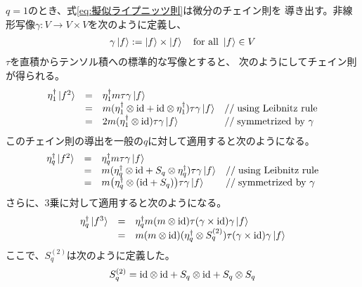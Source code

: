 {	$q=1$のとき、式\eqref{eq:擬似ライプニッツ則}は微分のチェイン則を
	導き出す。非線形写像$\gamma:V\to V\times V$を次のように定義し、
	\begin{equation*}\begin{split}
		\gamma\mathinner{|{f}\rangle} := \mathinner{|{f}\rangle}\times\mathinner{|{f}\rangle} \quad\text{for all }\mathinner{|{f}\rangle}\in V
	\end{split}\end{equation*}
	$\tau$を直積からテンソル積への標準的な写像とすると、
	次のようにしてチェイン則が得られる。
	\begin{equation*}\begin{array}{rcll}
		\eta_1^\dag\mathinner{|{f^2}\rangle} &=& \eta_1^\dag m\tau\gamma\mathinner{|{f}\rangle} \\
		 &=& m(\eta_1^\dag\otimes{\ensuremath{\operatorname{id}}} + {\operatorname{id}}\otimes\eta_1^\dag)\tau\gamma\mathinner{|{f}\rangle} 
		 	& //\;\text{using Leibnitz rule} \\
		 &=& 2m(\eta_1^\dag\otimes{\ensuremath{\operatorname{id}}})\tau\gamma\mathinner{|{f}\rangle} 
		 	& //\;\text{symmetrized by $\gamma$} \\
	\end{array}\end{equation*}
	このチェイン則の導出を一般の$q$に対して適用すると次のようになる。
	\begin{equation*}\begin{array}{rcll}
		\eta_q^\dag\mathinner{|{f^2}\rangle} &=& \eta_q^\dag m\tau\gamma\mathinner{|{f}\rangle} \\
		 &=& m(\eta_q^\dag\otimes{\ensuremath{\operatorname{id}}} + S_q\otimes\eta_q^\dag)\tau\gamma\mathinner{|{f}\rangle} 
		 	& //\;\text{using Leibnitz rule} \\
		 &=& m\bigl(\eta_q^\dag\otimes({\operatorname{id}} + S_q)\bigr)\tau\gamma\mathinner{|{f}\rangle} 
		 	& //\;\text{symmetrized by $\gamma$} \\
	\end{array}\end{equation*}
	さらに、$3$乗に対して適用すると次のようになる。
	\begin{equation*}\begin{array}{rcll}
		\eta_q^\dag\mathinner{|{f^3}\rangle} 
		&=& \eta_q^\dag m(m\otimes{\ensuremath{\operatorname{id}}})\tau(\gamma\times{\ensuremath{\operatorname{id}}})\gamma\mathinner{|{f}\rangle} \\
		&=& m(m\otimes{\ensuremath{\operatorname{id}}})(\eta_q^\dag\otimes S_q^{(2)})
			\tau(\gamma\times{\ensuremath{\operatorname{id}}})\gamma\mathinner{|{f}\rangle}  \\
	\end{array}\end{equation*}
	ここで、$S_q^{(2)}$は次のように定義した。
	\begin{equation*}\begin{split}
		S_q^{(2)} = {\operatorname{id}}\otimes{\ensuremath{\operatorname{id}}} + S_q\otimes{\ensuremath{\operatorname{id}}} + S_q\otimes S_q
	\end{split}\end{equation*}
}
